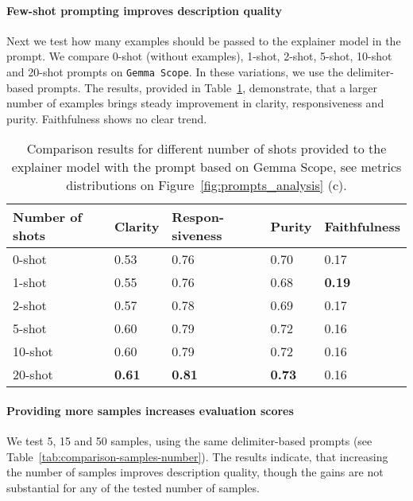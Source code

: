 \paragraph{Few-shot prompting improves description quality}
Next we test how many examples should be passed to the explainer model in the prompt. We compare 0-shot (without examples), 1-shot, 2-shot, 5-shot, 10-shot and 20-shot prompts on \texttt{Gemma Scope}. In these variations, we use the delimiter-based prompts. The results, provided in Table~\ref{tab:number-of-shots-in-prompt}, demonstrate, that a larger number of examples brings steady improvement in clarity, responsiveness and purity. Faithfulness shows no clear trend.  

\begin{table}[t]
\scriptsize
\centering
\begin{tabular}{p{1.2cm}p{1cm}p{1cm}p{1cm}p{1cm}} 
Number of shots &   Clarity     & Respon-siveness & Purity        & Faithfulness \\ \hline \hline 
0-shot             &    0.53       &   0.76          &  0.70         &  0.17   \\
1-shot             &    0.55       &   0.76          &  0.68         &  \textbf{0.19}  \\ 
2-shot             &    0.57       &   0.78          &  0.69         &  0.17  \\ 
5-shot             &    0.60       & 0.79            & 0.72           &  0.16  \\
10-shot             &   0.60       & 0.79            & 0.72           &  0.16  \\
20-shot             & \textbf{0.61} & \textbf{0.81}   & \textbf{0.73} &  0.16  \\ \hline 
\end{tabular}
\caption{Comparison results for different number of shots provided to the explainer model with the prompt based on Gemma Scope, see metrics distributions on Figure~\ref{fig:prompts_analysis} (c). }
\label{tab:number-of-shots-in-prompt}
\end{table}


\paragraph{Providing more samples increases evaluation scores}
We test 5, 15 and 50 samples, using the same delimiter-based prompts (see Table~\ref{tab:comparison-samples-number}). The results indicate, that increasing the number of samples improves description quality, though the gains are not substantial for any of the tested number of samples.

